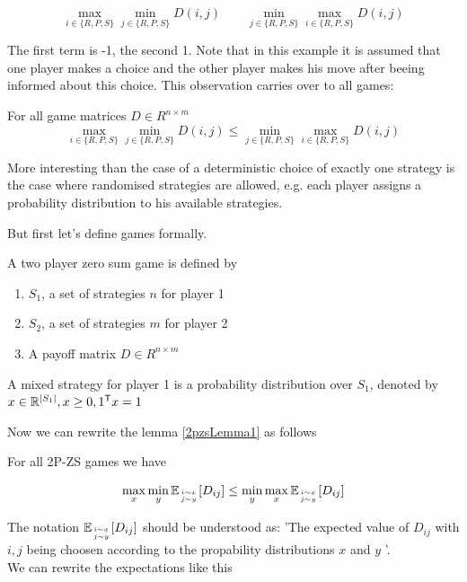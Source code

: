 \[\max_{i\in \{R,P,S\}} \min_{j\in \{R,P,S\}} D(i,j) \qquad \min_{j\in \{R,P,S\}}\max_{i\in \{R,P,S\}} D(i,j)\]

The first term is -1, the second 1. Note that in this example it is assumed that one player makes a choice and the other player makes his move after beeing informed about this choice. This observation carries over to all games:

\begin{lem}\label{2pzsLemma1} For all game matrices $D\in R^{n\times m}$
\[\max_{i\in \{R,P,S\}} \min_{j\in \{R,P,S\}} D(i,j) \leq \min_{j\in \{R,P,S\}}\max_{i\in \{R,P,S\}} D(i,j)\]
\end{lem}

More interesting than the case of a deterministic choice of exactly one strategy is the case where randomised strategies are allowed, e.g. each player assigns a probability distribution to his available strategies.

But first let's define games formally.

\begin{Def}[2P-ZS Games] A two player zero sum game is defined by 
\begin{enumerate}
\item $S_1$, a set of strategies $n$ for player 1
\item $S_2$, a set of strategies $m$ for player 2
\item A payoff matrix $D\in R^{n\times m}$ %
\end{enumerate}
\end{Def}

\begin{Def} A mixed strategy for player 1 is a probability distribution over $S_1$, denoted by $x\in \mathbb{R}^{|S_1|}, x\geq 0, {1}^\text{\upshape \sffamily T} x=1$
\end{Def}

Now we can rewrite the lemma \ref{2pzsLemma1} as follows

\begin{lem} For all 2P-ZS games we have

\[\max_x\min_y\mathbb{E}_{{i\sim x}\atop {j\sim y}} [D_{ij}] \leq \min_y\max_x\mathbb{E}_{{i\sim x}\atop {j\sim y}} [D_{ij}]\]

\end{lem}

The notation $\mathbb{E}_{{i\sim x}\atop {j\sim y}} [D_{ij}]$ should be understood as: 'The expected value of $D_{ij}$ with $i,j$ being choosen according to the propability distributions $x$ and $y$ '.\\ 
We can rewrite the expectations like this

